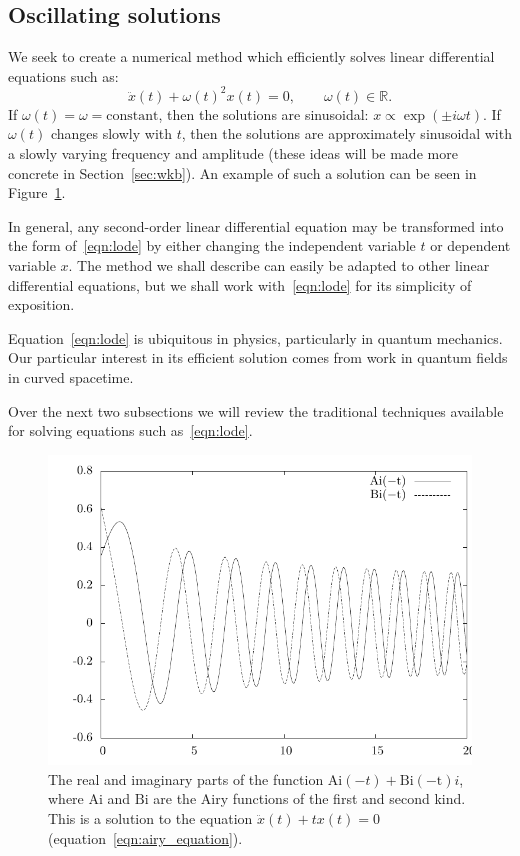 \subsection{Oscillating solutions}
We seek to create a numerical method which efficiently solves linear differential equations such as:
\begin{equation}
  \ddot{x}(t) + {\omega(t)}^2x(t) = 0,\qquad \omega(t)\in\mathbb{R}.
  \label{eqn:lode}
\end{equation}
If \(\omega(t)=\omega = \mathrm{constant}\), then the solutions are sinusoidal: \(x\propto \exp{(\pm i \omega t)}\). If \(\omega(t)\) changes slowly with \(t\), then the solutions are approximately sinusoidal with a slowly varying frequency and amplitude (these ideas will be made more concrete in Section~\ref{sec:wkb}). An example of such a solution can be seen in Figure~\ref{fig:airy}.

In general, any second-order linear differential equation may be transformed into the form of~\eqref{eqn:lode} by either changing the independent variable \(t\) or dependent variable \(x\). The method we shall describe can easily be adapted to other linear differential equations, but we shall work with~\eqref{eqn:lode} for its simplicity of exposition.

Equation~\eqref{eqn:lode} is ubiquitous in physics, particularly in quantum mechanics. Our particular interest in its efficient solution comes from work in quantum fields in curved spacetime.



Over the next two subsections we will review the traditional techniques available for solving equations such as~\eqref{eqn:lode}.

\begin{figure}[tp]
  \centering
  \includegraphics[width=\textwidth]{chapters/RKWKB/figures/airy}
  \caption{The real and imaginary parts of the function \(\mathrm{Ai}(-t) + \mathrm{Bi(-t)} i\), where \(\mathrm{Ai}\) and \(\mathrm{Bi}\) are the Airy functions of the first and second kind. This is a solution to the equation \({\ddot{x}(t) + t x(t) = 0}\) (equation~\ref{eqn:airy_equation}).}\label{fig:airy}
\end{figure}


